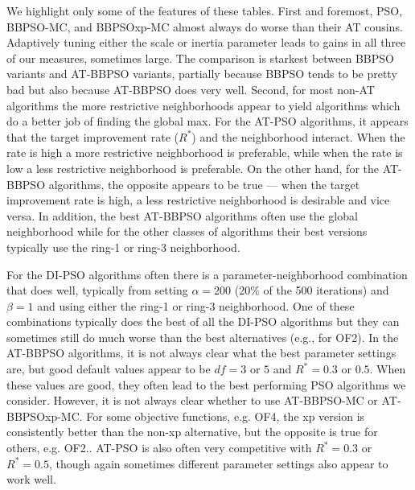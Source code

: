 \documentclass[12pt]{article}
\begin{document}
We highlight only some of the features of these tables. First and foremost, PSO, BBPSO-MC, and BBPSOxp-MC almost always do worse than their AT cousins. Adaptively tuning either the scale or inertia parameter leads to gains in all three of our measures, sometimes large. The comparison is starkest between BBPSO variants and AT-BBPSO variants, partially because BBPSO tends to be pretty bad but also because AT-BBPSO does very well. Second, for most non-AT algorithms the more restrictive neighborhoods appear to yield algorithms which do a better job of finding the global max. For the AT-PSO algorithms, it appears that the target improvement rate ($R^*$) and the neighborhood interact. When the rate is high a more restrictive neighborhood is preferable, while when the rate is low a less restrictive neighborhood is preferable. On the other hand, for the AT-BBPSO algorithms, the opposite appears to be true --- when the target improvement rate is high, a less restrictive neighborhood is desirable and vice versa. In addition, the best AT-BBPSO algorithms often use the global neighborhood while for the other classes of algorithms their best versions typically use the ring-1 or ring-3 neighborhood.

For the DI-PSO algorithms often there is a parameter-neighborhood combination that does well, typically from setting $\alpha=200$ (20\% of the 500 iterations) and $\beta=1$ and using either the ring-1 or ring-3 neighborhood. One of these combinations typically does the best of all the DI-PSO algorithms but they can sometimes still do much worse than the best alternatives (e.g., for OF2). In the AT-BBPSO algorithms, it is not always clear what the best parameter settings are, but good default values appear to be $df=3$ or $5$ and $R^*=0.3$ or $0.5$. When these values are good, they often lead to the best performing PSO algorithms we consider. However, it is not always clear whether to use AT-BBPSO-MC or AT-BBPSOxp-MC. For some objective functions, e.g. OF4, the xp version is consistently better than the non-xp alternative, but the opposite is true for others, e.g. OF2.. AT-PSO is also often very competitive with $R^*=0.3$ or $R^*=0.5$, though again sometimes different parameter settings also appear to work well. 
\end{document}
